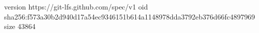 version https://git-lfs.github.com/spec/v1
oid sha256:f573a30b2d940d17a54ec9346151b614a1148978dda3792eb376d66fc4897969
size 43864

